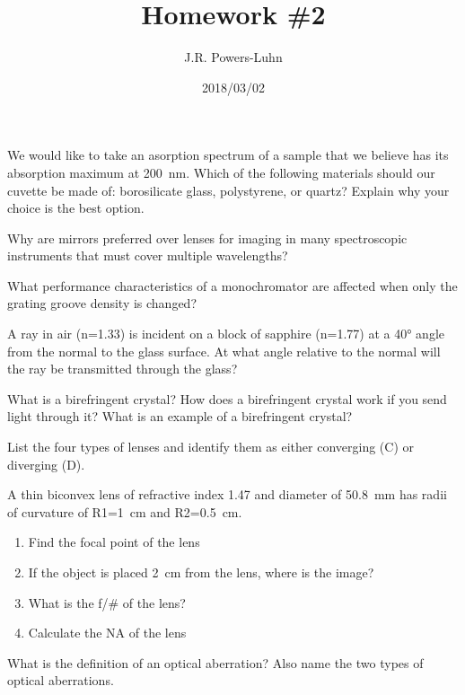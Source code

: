 \documentclass{hw}
\author{J.R. Powers-Luhn}
\date{2018/03/02}
\title{Homework \#2}
\begin{document}

\problem{}
	We would like to take an asorption spectrum of a sample that we believe has its absorption maximum at \SI{200}{\nano\meter}. Which of the following materials should our cuvette be made of: borosilicate glass, polystyrene, or quartz? Explain why your choice is the best option.
\solution
    

\problem{}
    Why are mirrors preferred over lenses for imaging in many spectroscopic instruments that must cover multiple wavelengths?
\solution


\problem{}
    What performance characteristics of a monochromator are affected when only the grating groove density is changed?
\solution

\problem{}
    A ray in air (n=\num{1.33}) is incident on a block of sapphire (n=\num{1.77}) at a \ang{40} angle from the normal to the glass surface. At what angle relative to the normal will the ray be transmitted through the glass?
\solution

\problem{}
    What is a birefringent crystal? How does a birefringent crystal work if you send light through it? What is an example of a birefringent crystal?
\solution

\problem{}
    List the four types of lenses and identify them as either converging (C) or diverging (D).
\solution

\problem{}
    A thin biconvex lens of refractive index \num{1.47} and diameter of \SI{50.8}{\milli\meter} has radii of curvature of R1=\SI{1}{\centi\meter} and R2=\SI{0.5}{\centi\meter}.
    \begin{enumerate}
        \item Find the focal point of the lens
        \item If the object is placed \SI{2}{\centi\meter} from the lens, where is the image?
        \item What is the f/\# of the lens?
        \item Calculate the NA of the lens
    \end{enumerate}
\solution

\problem{}
    What is the definition of an optical aberration? Also name the two types of optical aberrations.
\solution
\end{document}
